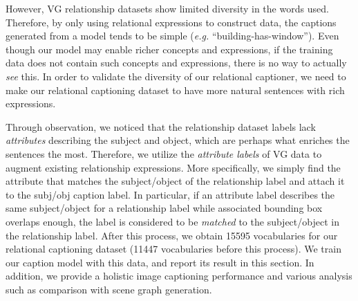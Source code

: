 \documentclass[10pt,twocolumn,letterpaper]{article}
\begin{document}
{
However, VG relationship datasets show limited diversity in the words used.
Therefore, by only using relational expressions to construct data, the captions generated from a model tends to be simple (\emph{e.g.} ``building-has-window'').
{Even though our model may enable richer concepts and expressions,} if the training data does not contain such concepts and expressions, there is no way to actually \emph{see} this.
In order to validate the diversity of our relational captioner, we need to make our relational captioning dataset to have more natural sentences with rich expressions.}


Through observation, {we noticed that the relationship dataset labels lack \emph{attributes} describing the subject and object, which are perhaps what enriches the sentences the most}.
Therefore, we utilize the \emph{attribute labels} of VG data to augment existing relationship expressions.
More specifically, we simply find the attribute that matches the subject/object of the relationship label and attach it to the subj/obj caption label.
In particular, if an attribute label describes the same subject/object for a relationship label while associated bounding box overlaps enough, the label is considered to be \emph{matched} to the subject/object in the relationship label.
{After this process, we obtain 15595 vocabularies for our relational captioning dataset (11447 vocabularies before this process).}
{We train our caption model with this data, and report its result in this section.}
In addition, we provide a holistic image captioning performance and various analysis such as comparison with scene graph generation.
\end{document}
